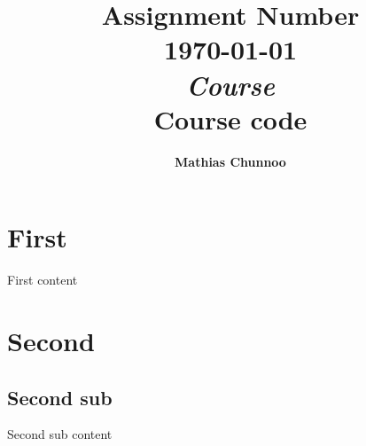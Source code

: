 \documentclass[11pt,norsk,a4paper]{article}
\title{
    \vspace{2in}
    \textmd{\textbf{Assignment Number}}\\
    \normalsize\vspace{0.1in}\small{\today}\\
    \vspace{0.1in}\large{\textit{Course} \\ Course code}
    \vspace{3in}
}
\author{\textbf{Mathias Chunnoo}}
\date{}
\begin{document}
\maketitle

\newpage
\section{First}
First content


\section{Second}
\subsection{Second sub}
Second sub content
\end{document}
